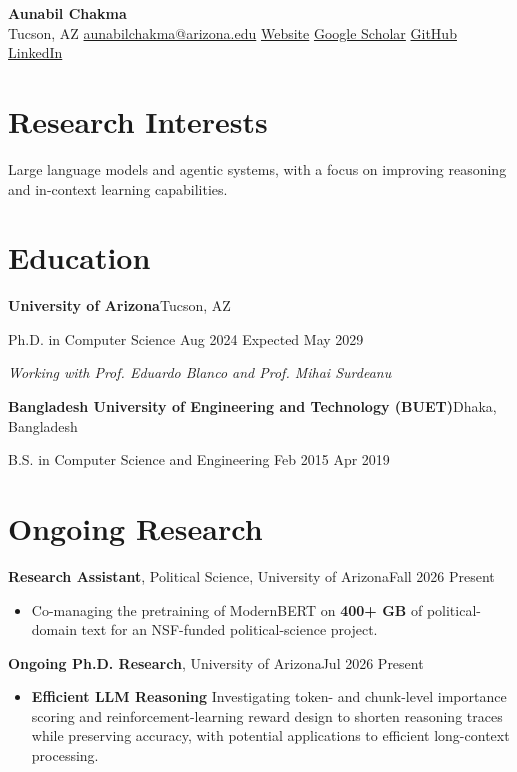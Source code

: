\documentclass[11pt]{extarticle}
\newcommand{\entryheading}[2]{%
  {\normalsize #1}\hfill{\small #2}\par
}
\newcommand{\entrydetail}[1]{{\small #1}\par}
\newcommand{\expectedgraduation}{May 2029}
\begin{document}
\begin{center}
  {\LARGE\textbf{Aunabil Chakma}}\\[-1pt]
  Tucson, AZ \;\textbullet\; 
  \href{mailto:aunabilchakma@arizona.edu}{aunabilchakma@arizona.edu} \;\textbullet\;
  \href{https://aunabil4602.github.io/}{Website} \;\textbullet\;
  \href{https://scholar.google.com/citations?hl=en&user=LQepJpUAAAAJ&view_op=list_works&sortby=pubdate}{Google Scholar} \;\textbullet\;
  \href{https://github.com/Aunabil4602}{GitHub} \;\textbullet\;
  \href{https://www.linkedin.com/in/aunabil-chakma-56052119b/}{LinkedIn}
\end{center}

\vspace{-0.55em}
\section*{Research Interests}
{\small Large language models and agentic systems, with a focus on improving reasoning and in-context learning capabilities.}

\section*{Education}
\entryheading{\textbf{University of Arizona}}{Tucson, AZ}
\entrydetail{Ph.D. in Computer Science \hfill Aug 2024 \textendash{} Expected \expectedgraduation}
\entrydetail{\textit{Working with Prof. Eduardo Blanco and Prof. Mihai Surdeanu}}

\vspace{3pt}
\entryheading{\textbf{Bangladesh University of Engineering and Technology (BUET)}}{Dhaka, Bangladesh}
\entrydetail{B.S. in Computer Science and Engineering \hfill Feb 2015 \textendash{} Apr 2019}

\section*{Ongoing Research}
\entryheading{\textbf{Research Assistant}, Political Science, University of Arizona}{Fall 2026 \textendash{} Present}
\begin{itemize}
  \item {\small Co-managing the pretraining of ModernBERT on \textbf{400+ GB} of political-domain text for an NSF-funded political-science project.}
\end{itemize}

\entryheading{\textbf{Ongoing Ph.D. Research}, University of Arizona}{Jul 2026 \textendash{} Present}
\begin{itemize}
  \item {\normalsize\bfseries Efficient LLM Reasoning} {\small Investigating token- and chunk-level importance scoring and reinforcement-learning reward design to shorten reasoning traces while preserving accuracy, with potential applications to efficient long-context processing.}
\end{itemize}
\end{document}
